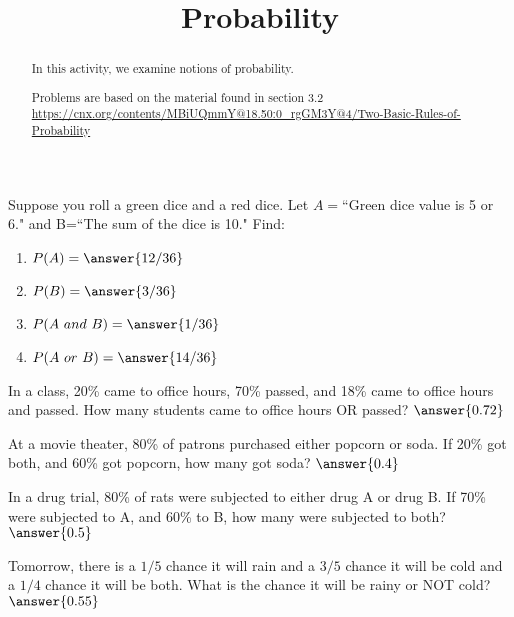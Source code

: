 \documentclass{ximera}
\title{Probability}
\begin{document}
      
\begin{abstract}
      
In this activity, we examine notions of probability.

Problems are based on the material found in section 3.2 \url{https://cnx.org/contents/MBiUQmmY@18.50:0_rgGM3Y@4/Two-Basic-Rules-of-Probability}
      
\end{abstract}
      
\maketitle
 
\begin{problem}
Suppose you roll a green dice and a red dice.  Let $A=$``Green dice value is 5 or 6." and B=``The sum of the dice is 10."
Find:
\begin{enumerate}
\item $P(A)=\answer{12/36}$
\item $P(B)=\answer{3/36}$
\item $P(A\ and\ B)=\answer{1/36}$
\item $P(A\ or\ B)=\answer{14/36}$
\end{enumerate}


\end{problem}
 
 
\begin{problem}
In a class, 20\% came to office hours, 70\% passed, and 18\% came to office hours and passed.  How many students came to office hours OR passed?  $\answer{0.72}$

\end{problem}
      

\begin{problem}
At a movie theater, 80\% of patrons purchased either popcorn or soda.  If 20\% got both, and 60\% got popcorn, how many got soda? $\answer{0.4}$
\end{problem}

\begin{problem}
In a drug trial, 80\% of rats were subjected to either drug A or drug B.  If 70\% were subjected to A, and 60\% to B, how many were subjected to both? $\answer{0.5}$
\end{problem}

\begin{problem}
Tomorrow, there is a $1/5$ chance it will rain and a $3/5$ chance it will be cold and a $1/4$ chance it will be both.  What is the chance it will be rainy or NOT cold? $\answer{0.55}$
\end{problem}
\end{document}
